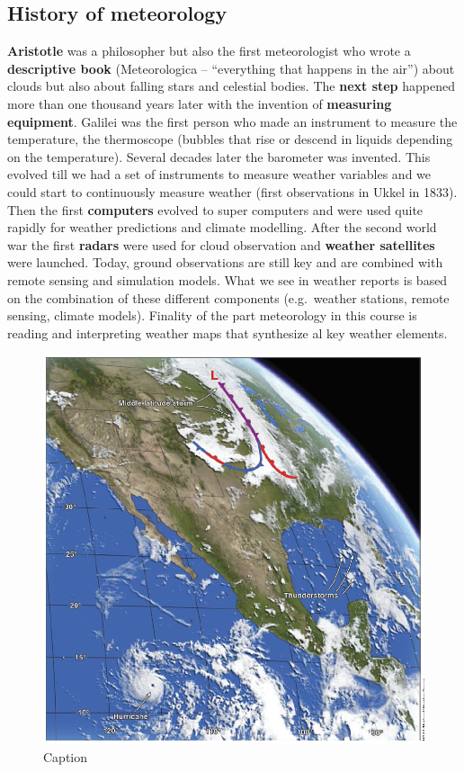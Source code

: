 \documentclass[12pt,oneside]{book}
\begin{document}
\subsection{History of meteorology}\label{history-of-meteorology}

\textbf{Aristotle} was a philosopher but also the first meteorologist
who wrote a \textbf{descriptive book} (Meteorologica -- ``everything
that happens in the air'') about clouds but also about falling stars and
celestial bodies. The \textbf{next step} happened more than one thousand
years later with the invention of \textbf{measuring equipment}. Galilei
was the first person who made an instrument to measure the temperature,
the thermoscope (bubbles that rise or descend in liquids depending on
the temperature). Several decades later the barometer was invented. This
evolved till we had a set of instruments to measure weather variables
and we could start to continuously measure weather (first observations
in Ukkel in 1833). Then the first \textbf{computers} evolved to super
computers and were used quite rapidly for weather predictions and
climate modelling. After the second world war the first \textbf{radars}
were used for cloud observation and \textbf{weather satellites} were
launched. Today, ground observations are still key and are combined with
remote sensing and simulation models. What we see in weather reports is
based on the combination of these different components (e.g.~weather
stations, remote sensing, climate models). Finality of the part
meteorology in this course is reading and interpreting weather maps that
synthesize al key weather elements.

\begin{figure}

{\centering \includegraphics[width=0.5\linewidth]{figures/Figure17} 

}

\caption{Caption}\label{fig:History1}
\end{figure}
\end{document}
